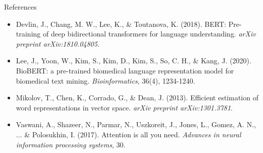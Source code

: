 \documentclass[aspectratio=169]{beamer}
\begin{document}
	
	\begin{frame}{References}
		\begin{itemize}
			\item Devlin, J., Chang, M. W., Lee, K., \& Toutanova, K. (2018). BERT: Pre-training of deep bidirectional transformers for language understanding. \textit{arXiv preprint arXiv:1810.04805}.
			\item Lee, J., Yoon, W., Kim, S., Kim, D., Kim, S., So, C. H., \& Kang, J. (2020). BioBERT: a pre-trained biomedical language representation model for biomedical text mining. \textit{Bioinformatics}, 36(4), 1234-1240.
			\item Mikolov, T., Chen, K., Corrado, G., \& Dean, J. (2013). Efficient estimation of word representations in vector space. \textit{arXiv preprint arXiv:1301.3781}.
			\item Vaswani, A., Shazeer, N., Parmar, N., Uszkoreit, J., Jones, L., Gomez, A. N., ... \& Polosukhin, I. (2017). Attention is all you need. \textit{Advances in neural information processing systems}, 30.
		\end{itemize}
	\end{frame}
	
\end{document}
